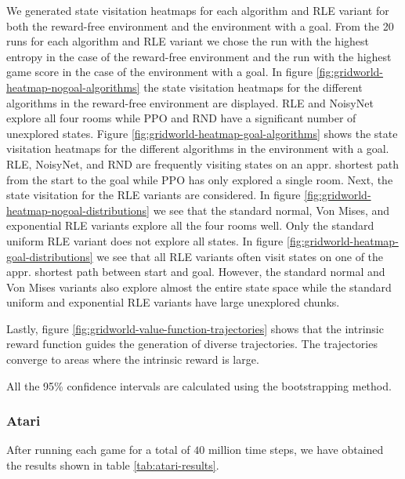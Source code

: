 \documentclass[10pt]{article} %
\begin{document}
We generated state visitation heatmaps for each algorithm and RLE variant for both the reward-free environment and the environment with a goal. From the 20 runs for each algorithm and RLE variant we chose the run with the highest entropy in the case of the reward-free environment and the run with the highest game score in the case of the environment with a goal. In figure \ref{fig:gridworld-heatmap-nogoal-algorithms} the state visitation heatmaps for the different algorithms in the reward-free environment are displayed. RLE and NoisyNet explore all four rooms while PPO and RND have a significant number of unexplored states. Figure \ref{fig:gridworld-heatmap-goal-algorithms} shows the state visitation heatmaps for the different algorithms in the environment with a goal. RLE, NoisyNet, and RND are frequently visiting states on an appr. shortest path from the start to the goal while PPO has only explored a single room. Next, the state visitation for the RLE variants are considered. In figure \ref{fig:gridworld-heatmap-nogoal-distributions} we see that the standard normal, Von Mises, and exponential RLE variants explore all the four rooms well. Only the standard uniform RLE variant does not explore all states. In figure \ref{fig:gridworld-heatmap-goal-distributions} we see that all RLE variants often visit states on one of the appr. shortest path between start and goal. However, the standard normal and Von Mises variants also explore almost the entire state space while the standard uniform and exponential RLE variants have large unexplored chunks.

Lastly, figure \ref{fig:gridworld-value-function-trajectories} shows that the intrinsic reward function guides the generation of diverse trajectories. The trajectories converge to areas where the intrinsic reward is large. 

All the 95\% confidence intervals are calculated using the bootstrapping method. 

\subsubsection{Atari}

\noindent After running each game for a total of $40$ million time steps, we have obtained the results shown in table \ref{tab:atari-results}.
\end{document}
